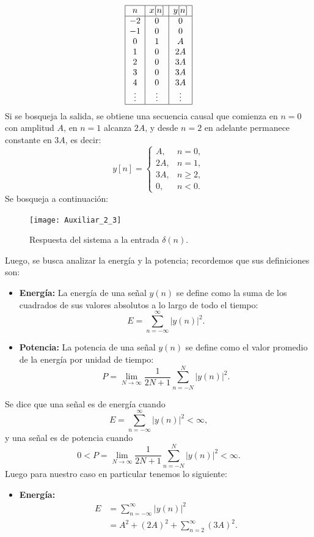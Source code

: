 \documentclass[
  11pt,
  letterpaper,
   addpoints,
  ]{exam}
\begin{document}
\begin{questions}
\begin{solution}
\[
\begin{array}{|c|c|c|}
\hline
n & x[n] & y[n] \\
\hline
-2 & 0 & 0 \\
-1 & 0 & 0 \\
0 & 1 & A \\
1 & 0 & 2A \\
2 & 0 & 3A \\
3 & 0 & 3A \\
4 & 0 & 3A \\
\vdots & \vdots & \vdots \\
\hline
\end{array}
\]
Si se bosqueja la salida, se obtiene una secuencia causal que comienza en $n=0$ con amplitud $A$, 
en $n=1$ alcanza $2A$, y desde $n=2$ en adelante permanece constante en $3A$, es decir:
\begin{equation}
y[n] = 
\begin{cases}
A, & n=0, \\
2A, & n=1, \\
3A, & n \geq 2, \\
0, & n<0.
\end{cases}
\end{equation}
Se bosqueja a continuación:
\begin{figure}[H]
  \centering
  \texttt{[image: Auxiliar\_2\_3]}
  \caption{Respuesta del sistema a la entrada $\delta(n)$.}
\end{figure}
Luego, se busca analizar la energía y la potencia; recordemos que sus definiciones son:
\begin{itemize}
  \item \textbf{Energía:} La energía de una señal $y(n)$ se define como la suma de los cuadrados de sus valores absolutos a lo largo de todo el tiempo:
\begin{equation}
E = \sum_{n=-\infty}^{\infty} |y(n)|^2.
\end{equation}
\item \textbf{Potencia:} La potencia de una señal $y(n)$ se define como el valor promedio de la energía por unidad de tiempo:
\begin{equation}
P = \lim_{N \to \infty} \frac{1}{2N+1} \sum_{n=-N}^{N} |y(n)|^2.
\end{equation}
\end{itemize}
Se dice que una señal es de energía cuando
\begin{equation}
E = \sum_{n=-\infty}^{\infty} |y(n)|^2 < \infty,
\end{equation}
y una señal es de potencia cuando
\begin{equation}
0 < P = \lim_{N \to \infty} \frac{1}{2N+1} \sum_{n=-N}^{N} |y(n)|^2 < \infty.
\end{equation}
Luego para nuestro caso en particular tenemos lo siguiente:
\begin{itemize}
\item \textbf{Energía:} 
\begin{align}
E &= \sum_{n=-\infty}^{\infty} |y(n)|^2 \\
  &= A^2 + (2A)^2 + \sum_{n=2}^{\infty} (3A)^2.
\end{align}


\end{itemize}
\end{solution}
\end{questions}
\end{document}
